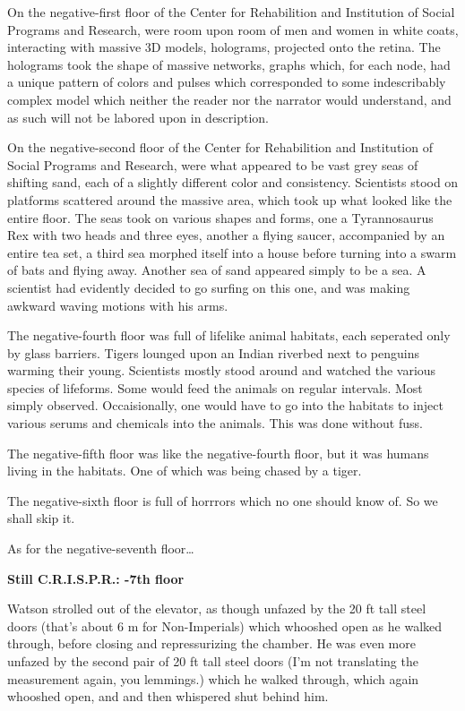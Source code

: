 \documentclass[12pt]{article}
\begin{document}
On the negative-first floor of the  Center for Rehabilition and Institution of Social Programs and Research, were room upon room of men and women in white coats, interacting with massive 3D models, holograms, projected onto the retina. The holograms took the shape of massive networks, graphs which, for each node, had a unique pattern of colors and pulses which corresponded to some indescribably complex model which neither the reader nor the narrator would understand, and as such will not be labored upon in description.

On the negative-second floor of the Center for Rehabilition and Institution of Social Programs and Research, were what appeared to be vast grey seas of shifting sand, each of a slightly different color and consistency. Scientists stood on platforms scattered around the massive area, which took up what looked like the entire floor. The seas took on various shapes and forms, one a Tyrannosaurus Rex with two heads and three eyes, another a flying saucer, accompanied by an entire tea set, a third sea morphed itself into a house before turning into a swarm of bats and flying away. Another sea of sand appeared simply to be a sea. A scientist had evidently decided to go surfing on this one, and was making awkward waving motions with his arms.

The negative-fourth floor was full of lifelike animal habitats, each seperated only by glass barriers. Tigers lounged upon an Indian riverbed next to penguins warming their young. Scientists mostly stood around and watched the various species of lifeforms. Some would feed the animals on regular intervals. Most simply observed. Occaisionally, one would have to go into the habitats to inject various serums and chemicals into the animals. This was done without fuss.

The negative-fifth floor was like the negative-fourth floor, but it was humans living in the habitats. One of which was being chased by a tiger.

The negative-sixth floor is full of horrrors which no one should know of. So we shall skip it.

As for the negative-seventh floor\ldots{}

\textbf{Still C.R.I.S.P.R.: -7th floor}

Watson strolled out of the elevator, as though unfazed by the 20 ft tall steel doors (that's about 6 m for Non-Imperials) which whooshed open as he walked through, before closing and repressurizing the chamber. He was even more unfazed by the second pair of 20 ft tall steel doors (I'm not translating the measurement again, you lemmings.) which he walked through, which again whooshed open, and and then whispered shut behind him.
\end{document}
